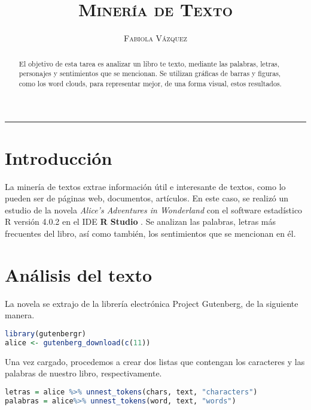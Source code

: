 \documentclass[12pt,letterpaper]{article}
\title{\textsc{Minería de Texto}}
\author{\textsc{Fabiola Vázquez}}
\begin{document}
\maketitle
\begin{abstract}
\begin{center}
El objetivo de esta tarea es analizar un libro te texto, mediante   las palabras, letras, personajes y  sentimientos que se mencionan. Se utilizan gráficas de barras y figuras, como los word clouds, para representar mejor, de una forma visual, estos resultados.
\end{center}
\end{abstract}
\hrule
\section{Introducción}
La minería de textos extrae información útil e interesante de textos, como lo pueden ser  de páginas web, documentos, artículos. En este caso, se realizó un estudio de la novela \textit{Alice's Adventures in Wonderland} \cite{alice} con el software estadístico R versión 4.0.2 \cite{R} en el IDE \textbf{R Studio} \cite{rstudio}. Se analizan las palabras, letras más frecuentes del libro, así como también, los sentimientos que se mencionan en él. 

\section{Análisis del texto}
La novela se extrajo de la librería electrónica Project Gutenberg, de la siguiente manera.
\begin{center}
\begin{lstlisting}[language=R]
library(gutenbergr)
alice <- gutenberg_download(c(11))
\end{lstlisting}
\end{center}
Una vez cargado, procedemos a crear dos listas que contengan los caracteres y las palabras de nuestro libro, respectivamente.
\begin{lstlisting}[language=R]
letras = alice %>% unnest_tokens(chars, text, "characters") 
palabras = alice%>% unnest_tokens(word, text, "words")
\end{lstlisting}
\end{document}
